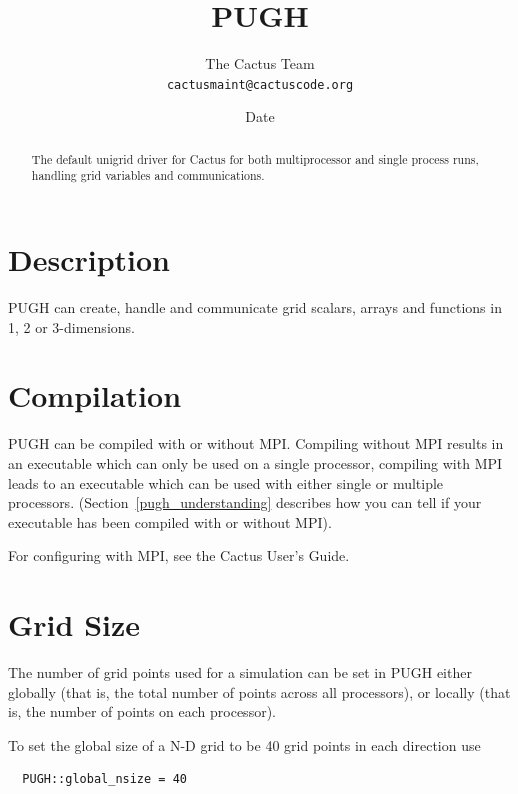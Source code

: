 \documentclass{article}
\begin{document}
\title{PUGH}
\author{The Cactus Team\\{\tt cactusmaint@cactuscode.org}}
\date{$ $Date$ $}

\maketitle


\begin{abstract}
The default unigrid driver for Cactus for both multiprocessor and single process runs, handling grid variables and communications.
\end{abstract}

\section{Description}

PUGH can create, handle and communicate grid scalars, arrays and functions
in 1, 2 or 3-dimensions.

\section{Compilation}

PUGH can be compiled with or without MPI. Compiling without MPI results
in an executable which can only be used on a single processor, compiling
with MPI leads to an executable which can be used with either single or
multiple processors.
(Section~\ref{pugh_understanding} describes how you can tell if your
executable has been compiled with or without MPI).

For configuring with MPI, see the Cactus User's Guide.

\section{Grid Size}

The number of grid points used for a simulation can be set in PUGH either
globally (that is, the total number of points across all processors), or
locally (that is, the number of points on each processor).

To set the global size of a N-D grid to be 40 grid points in each direction use

\begin{verbatim}
  PUGH::global_nsize = 40
\end{verbatim}
\end{document}

